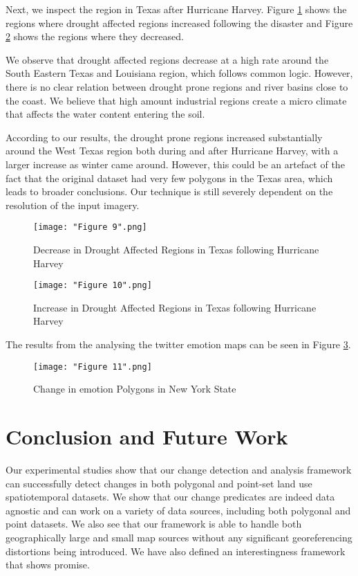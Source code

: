 \documentclass[conference]{IEEEtran}
\begin{document}
Next, we inspect the region in Texas after Hurricane Harvey. Figure \ref{Figure 9} shows the regions where drought affected regions increased following the disaster and Figure \ref{Figure 10} shows the regions where they decreased.

We observe that drought affected regions decrease at a high rate around the South Eastern Texas and Louisiana region, which follows common logic. However, there is no clear relation between drought prone regions and river basins close to the coast. We believe that high amount industrial regions create a micro climate that affects the water content entering the soil.

According to our results, the drought prone regions increased substantially around the West Texas region both during and after Hurricane Harvey, with a larger increase as winter came around. However, this could be an artefact of the fact that the original dataset had very few polygons in the Texas area, which leads to broader conclusions. Our technique is still severely dependent on the resolution of the input imagery.

\begin{figure}[ht]
\centerline{\texttt{[image: "Figure 9".png]}}
\caption{Decrease in Drought Affected Regions in Texas following Hurricane Harvey}
\label{Figure 9}
\end{figure}

\begin{figure}[ht]
\centerline{\texttt{[image: "Figure 10".png]}}
\caption{Increase in Drought Affected Regions in Texas following Hurricane Harvey}
\label{Figure 10}
\end{figure}

The results from the analysing the twitter emotion maps can be seen in Figure \ref{Figure 11}.

\begin{figure}[ht]
\centerline{\texttt{[image: "Figure 11".png]}}
\caption{Change in emotion Polygons in New York State}
\label{Figure 11}
\end{figure}

\section{Conclusion and Future Work}

Our experimental studies show that our change detection and analysis framework can successfully detect changes in both polygonal and point-set land use spatiotemporal datasets. We show that our change predicates are indeed data agnostic and can work on a variety of data sources, including both polygonal and point datasets. We also see that our framework is able to handle both geographically large and small map sources without any significant georeferencing distortions being introduced. We have also defined an interestingness framework that shows promise.
 
\end{document}
